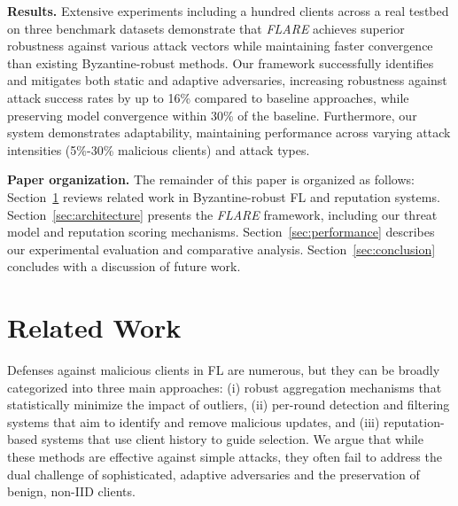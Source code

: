 \documentclass[lettersize,journal]{IEEEtran}
\begin{document}
\textbf{Results.} Extensive experiments including a  hundred clients across a real testbed on three benchmark datasets demonstrate that \textit{FLARE} achieves superior robustness against various attack vectors while maintaining faster convergence than existing Byzantine-robust methods. Our framework successfully identifies and mitigates both static and adaptive adversaries, increasing robustness against attack success rates by up to 16\% compared to baseline approaches, while preserving model convergence within 30\% of the baseline. Furthermore, our system demonstrates adaptability, maintaining performance across varying attack intensities (5\%-30\% malicious clients) and attack types.

\textbf{Paper organization.} The remainder of this paper is organized as follows: Section~\ref{sec:related_work} reviews related work in Byzantine-robust FL and reputation systems. Section~\ref{sec:architecture} presents the \textit{FLARE} framework, including our threat model and reputation scoring mechanisms. Section~\ref{sec:performance} describes our experimental evaluation and comparative analysis. Section~\ref{sec:conclusion}  concludes with a discussion of future work.

\section{Related Work} \label{sec:related_work}
Defenses against malicious clients in FL are numerous, but they can be broadly categorized into three main approaches: (i) robust aggregation mechanisms that statistically minimize the impact of outliers, (ii) per-round detection and filtering systems that aim to identify and remove malicious updates, and (iii) reputation-based systems that use client history to guide selection. We argue that while these methods are effective against simple attacks, they often fail to address the dual challenge of sophisticated, adaptive adversaries and the preservation of benign, non-IID clients.
\end{document}
